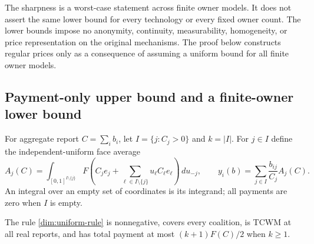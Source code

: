 The sharpness is a worst-case statement across finite owner models.
It does not assert the same lower bound for every technology or every fixed
owner count. The lower bounds impose no anonymity, continuity,
measurability, homogeneity, or price representation on the original
mechanisms. The proof below constructs regular prices only as a consequence
of assuming a uniform bound for all finite owner models.

\subsection{Payment-only upper bound and a finite-owner lower bound}

For aggregate report $C=\sum_i b_i$, let $I=\{j:C_j>0\}$ and $k=|I|$.
For $j\in I$ define the independent-uniform face average
\begin{equation}\label{dim:uniform-rule}
 A_j(C)=\int_{[0,1]^{I\setminus\{j\}}}
 F\left(C_j e_j+\sum_{\ell\in I\setminus\{j\}}u_\ell C_\ell e_\ell\right)
 \,du_{-j},\qquad
 y_i(b)=\sum_{j\in I}\frac{b_{ij}}{C_j}A_j(C).
\end{equation}
An integral over an empty set of coordinates is its integrand; all payments
are zero when $I$ is empty.

\begin{proposition}\label{dim:uniform-upper}
The rule \eqref{dim:uniform-rule} is nonnegative, covers every coalition,
is TCWM at all real reports, and has total payment at most
$(k+1)F(C)/2$ when $k\ge1$.
\end{proposition}

